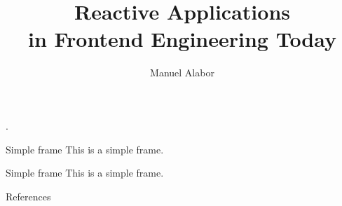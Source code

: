 \documentclass{beamer}
\title{Reactive Applications\\in Frontend Engineering Today}
\author{Manuel Alabor}
\institute{Master Seminar\\HSR University of Applied Sciences Rapperswil}
\date{}
\begin{document}
\begin{frame}
	\maketitle
	.
\end{frame}

\begin{frame}{Simple frame}
	This is a simple frame.
\end{frame}

\begin{frame}{Simple frame}
	This is a simple frame.
\end{frame}

\appendix
\begin{frame}{References}
	
	
\end{frame}
\end{document}
